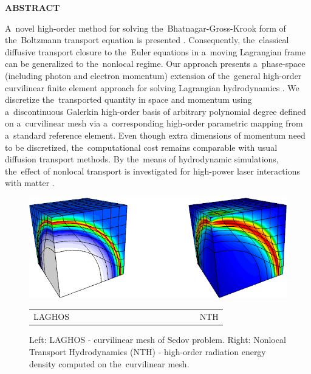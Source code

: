 \documentclass[11pt,a4paper]{article}
\begin{document}
\begin{center}
\textbf{ABSTRACT}\\[1mm]
\end{center}
%
%
A~novel high-order method for solving the~Bhatnagar-Gross-Krook form of 
the~Boltzmann transport equation is presented \cite{DGBGKT}.  
Consequently, the~classical diffusive transport closure to the~Euler equations 
in a~moving Lagrangian frame can be generalized to the~nonlocal regime. 
Our approach presents a~phase-space (including photon and electron momentum) 
extension of the~general high-order curvilinear finite element approach 
for solving Lagrangian hydrodynamics \cite{LAGHOS}. 
We discretize the~transported quantity in space and momentum using 
a~discontinuous Galerkin high-order basis of arbitrary polynomial degree 
defined on a~curvilinear mesh via a~corresponding high-order parametric 
mapping from a~standard reference element. Even though extra dimensions of 
momentum need to be discretized, the~computational cost remains comparable 
with usual diffusion transport methods. 
By the~means of hydrodynamic simulations, the~effect of nonlocal transport is 
investigated for high-power laser interactions with matter \cite{PETE}. 
%
%
\begin{figure}[htbp]
\centering
  \includegraphics[height=0.3\textwidth]{figs_NTH/nth_sedov.png}
  \begin{tabular}{cc}
    LAGHOS $\qquad\qquad\qquad\qquad\qquad\qquad\qquad$ & NTH
  \end{tabular} 
  \caption{Left: LAGHOS - curvilinear mesh of Sedov problem. 
           Right: Nonlocal Transport Hydrodynamics (NTH) - 
		   high-order radiation energy density computed on the~curvilinear mesh.
  \label{fig:FirstFigure}}
\end{figure}
\end{document}
